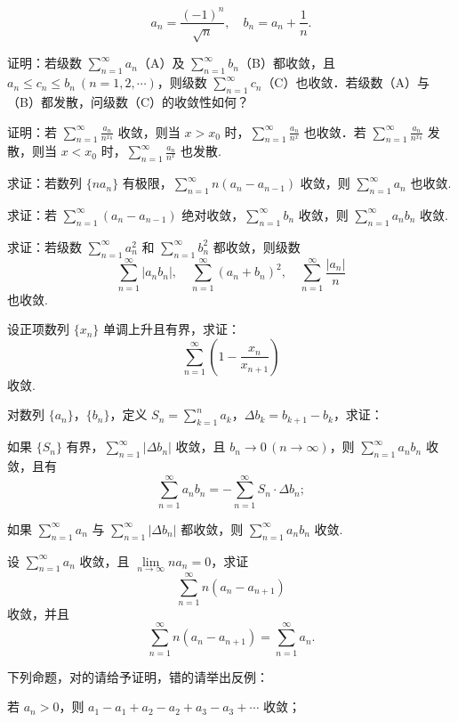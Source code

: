 \begin{xiti}
\[
a_{n}=\frac{(-1)^{n}}{\sqrt{n}},\quad b_{n}=a_{n}+\frac{1}{n}.
\]
\item 证明：若级数 $\displaystyle\sum_{n=1}^{\infty}a_{n}$（A）及 $\sum_{n=1}^{\infty}b_{n}$（B）都收敛，且 $a_{n}\leqslant c_{n}\leqslant b_{n}\ (n=1,2,\cdots)$，则级数 $\sum_{n=1}^{\infty}c_{n}$（C）也收敛．若级数（A）与（B）都发散，问级数（C）的收敛性如何？
\item 证明：若 $\displaystyle\sum_{n=1}^{\infty}\frac{a_{n}}{n^{x_{0}}}$ 收敛，则当 $x>x_{0}$ 时，$\sum_{n=1}^{\infty}\frac{a_{n}}{n^{x}}$ 也收敛．若 $\sum_{n=1}^{\infty}\frac{a_{n}}{n^{x_{0}}}$ 发散，则当 $x<x_{0}$ 时，$\sum_{n=1}^{\infty}\frac{a_{n}}{n^{x}}$ 也发散.
\item 求证：若数列 $\{na_n\}$ 有极限，$\sum_{n=1}^{\infty}n(a_n-a_{n-1})$ 收敛，则 $\sum_{n=1}^{\infty}a_n$ 也收敛.
\item 求证：若 $\displaystyle\sum_{n=1}^{\infty}(a_{n}-a_{n-1})$ 绝对收敛，$\sum_{n=1}^{\infty}b_{n}$ 收敛，则 $\sum_{n=1}^{\infty}a_{n}b_{n}$ 收敛.
\item 求证：若级数 $\displaystyle\sum_{n=1}^{\infty}a_{n}^{2}$ 和 $\sum_{n=1}^{\infty}b_{n}^{2}$ 都收敛，则级数
\[
\sum_{n=1}^{\infty}|a_{n}b_{n}|,\quad\sum_{n=1}^{\infty}(a_{n}+b_{n})^{2},\quad\sum_{n=1}^{\infty}\frac{|a_{n}|}{n}
\]
也收敛.
\item 设正项数列 $\{x_{n}\}$ 单调上升且有界，求证：
\[
\sum_{n=1}^{\infty}\left(1-\frac{x_{n}}{x_{n+1}}\right)
\]
收敛.
\item 对数列 $\{a_{n}\}$，$\{b_{n}\}$，定义 $S_{n}=\sum_{k=1}^{n}a_{k}$，$\Delta b_{k}=b_{k+1}-b_{k}$，求证：
\begin{ziti}
\item 如果 $\{S_{n}\}$ 有界，$\displaystyle\sum_{n=1}^{\infty}|\Delta b_{n}|$ 收敛，且 $b_{n}\to0\,(n\to\infty)$，则 $\sum_{n=1}^{\infty}a_{n}b_{n}$ 收敛，且有
\[
\sum_{n=1}^{\infty}a_{n}b_{n}=-\sum_{n=1}^{\infty}S_{n}\cdot\Delta b_{n};
\]
\item 如果 $\displaystyle\sum_{n=1}^{\infty}a_{n}$ 与 $\sum_{n=1}^{\infty}|\Delta b_{n}|$ 都收敛，则 $\sum_{n=1}^{\infty}a_{n}b_{n}$ 收敛.
\end{ziti}
\item 设 $\displaystyle\sum_{n=1}^{\infty}a_{n}$ 收敛，且 $\lim\limits_{n\to\infty}na_{n}=0$，求证
\[
\sum_{n=1}^{\infty}n(a_{n}-a_{n+1})
\]
收敛，并且
\[
\sum_{n=1}^{\infty}n(a_{n}-a_{n+1})=\sum_{n=1}^{\infty}a_{n}.
\]
\item 下列命题，对的请给予证明，错的请举出反例：
\begin{ziti}
\item 若 $a_{n}>0$，则 $a_{1}-a_{1}+a_{2}-a_{2}+a_{3}-a_{3}+\cdots$ 收敛；

\end{ziti}
\end{xiti}
